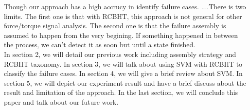 \indent Though our approach has a high accrucy in identify failure cases. ....There is two limits. The first one is that with RCBHT, this approach is not general for other force/torque signal analysis. The second one is that the failure assembly is assumed to happen from the very begining. If something happened in between the process, we can't detect it as soon but until a state finished. \\
\indent In section 2, we will detail our previous work including assembly strategy and RCBHT taxonomy. In section 3, we will talk about using SVM with RCBHT to classify the failure cases. In section 4, we will give a brief review about SVM. In section 5, we will depict our experiment result and have a brief discuss about the result and limitation of the approach. In the last section, we will conclude this paper and talk about our future work. \\
